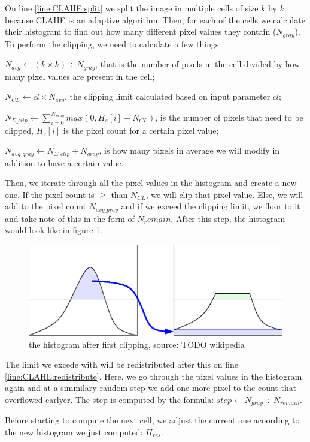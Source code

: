 On line \ref{line:CLAHE:split} we split the image in multiple cells of size $k$ by $k$ because CLAHE is an adaptive algorithm.
Then, for each of the cells we calculate their histogram to find out how many different pixel values they contain ($N_{gray}$). To perform the clipping, we need to calculate a few things:

$N_{avg} \gets (k \times k) \div N_{gray}$, that is the number of pixels in the cell divided by how many pixel values are present in the cell;

$N_{CL} \gets cl \times N_{avg}$, the clipping limit calculated based on input parameter $cl$;

$N_{\Sigma\_clip} \gets \sum_{i=0}^{N_{gray}} max(0, H_s[i] - N_{CL})$, is the number of pixels that need to be clipped, $H_s[i]$ is the pixel count for a certain pixel value;

$N_{avg\_gray} \gets N_{\Sigma\_clip} \div N_{gray}$, is how many pixels in average we will modify in addition to have a certain value.

Then, we iterate through all the pixel values in the histogram and create a new one. If the pixel count is $\geq$ than $N_{CL}$, we will clip that pixel value. Else, we will add to the pixel count $N_{avg\_gray}$ and if we exceed the clipping limit, we floor to it and take note of this in the form of $N_remain$. After this step, the histogram would look like in figure \ref{fig:CLAHE_hist}.

\begin{figure}
    \centering
    \includegraphics[width=0.4\columnwidth]{img/algos/Clahe-redistribution.eps}
    \caption{the histogram after first clipping, source: TODO wikipedia}
    \label{fig:CLAHE_hist}
\end{figure}


The limit we excede with will be redistributed after this on line \ref{line:CLAHE:redistribute}. Here, we go through the pixel values in the histogram again and at a simmilary random step we add one more pixel to the count that overflowed earlyer. The step is computed by the formula: $step \gets N_{gray} \div N_{remain}$.

Before starting to compute the next cell, we adjust the current one acoording to the new histogram we just computed: $H_{res}$.

